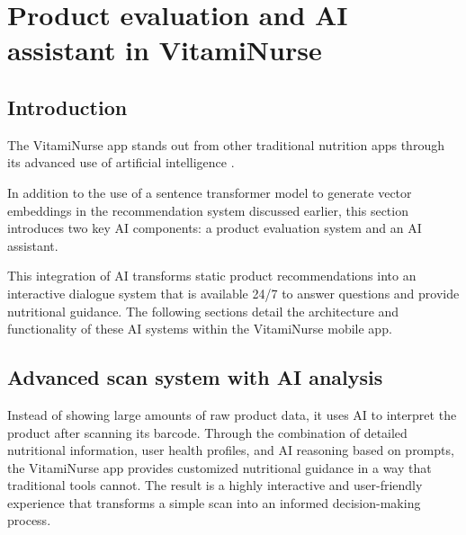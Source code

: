 

\chapter{Product evaluation and AI assistant in VitamiNurse}
\section*{Introduction}
The VitamiNurse app stands out from other traditional nutrition apps through its advanced use of artificial intelligence .

In addition to the use of a sentence transformer model to generate vector embeddings in the recommendation system discussed earlier, this section introduces two key AI components: a product evaluation system and an AI assistant.

This integration of AI transforms static product recommendations into an interactive dialogue system that is available 24/7 to answer questions and provide nutritional guidance. The following sections detail the architecture and functionality of these AI systems within the VitamiNurse mobile app.

\section{Advanced scan system with AI analysis }

Instead of showing large amounts of raw product data, it uses AI to interpret the product after scanning its barcode.  Through the combination of detailed nutritional information, user health profiles, and AI reasoning based on prompts, the VitamiNurse app provides customized nutritional guidance in a way that traditional tools cannot. The result is a highly interactive and user-friendly experience that transforms a simple scan into an informed decision-making process.

